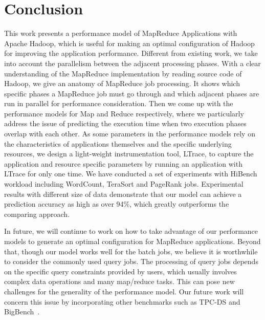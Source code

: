 \section{Conclusion}
This work presents a performance model of MapReduce Applications with Apache Hadoop, which is useful for making an optimal configuration of Hadoop for improving the application performance.
Different from existing work, we take into account the parallelism between the adjacent processing phases.
With a clear understanding of the MapReduce implementation by reading source code of Hadoop, we give an anatomy of MapReduce job processing. It shows which specific phases a MapReduce job must go through and which adjacent phases are run in parallel for performance consideration.
Then we come up with the performance models for Map and Reduce respectively, where we particularly address the issue of predicting the execution time when two execution phases overlap with each other.
As some parameters in the performance models rely on the characteristics of applications themselves and the specific underlying resources, we design a light-weight instrumentation tool, LTrace, to capture the application and resource specific parameters by running an application with LTrace for only one time.
We have conducted a set of experiments with HiBench workload including WordCount, TeraSort and PageRank jobs. Experimental results with different size of data demonstrate that our model can achieve a prediction accuracy as high as over 94\%, which greatly outperforms the comparing approach.

In future, we will continue to work on how to take advantage of our performance models to generate an optimal configuration for MapReduce applications. Beyond that, though our model works well for the batch jobs, we believe it is worthwhile to consider the commonly used query jobs.  The processing of query jobs depends on the specific query constraints provided by users, which usually involves complex data operations and many map/reduce tasks. This can pose new challenges for the generality of the performance model. Our future work will concern this issue by incorporating other benchmarks such as TPC-DS\cite{Nambiar2006The} and BigBench~\cite{Ghazal2013BigBench}.

